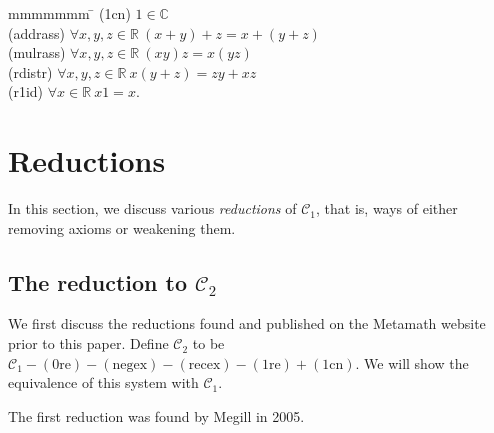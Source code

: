 \documentclass{article}
\newcommand\bC{\mathbb{C}}
\newcommand\bR{\mathbb{R}}
\newcommand\cC{\mathcal{C}}
\begin{document}
\begin{tabbing}
mmmmmmm \=\kill
(1cn)     \> $1 \in \bC$ \\
(addrass) \> $\forall x,y,z \in \bR\ (x+y)+z=x+(y+z)$ \\
(mulrass) \> $\forall x,y,z \in \bR\ (xy)z=x(yz)$ \\
(rdistr)  \> $\forall x,y,z \in \bR\ x(y+z) = zy + xz$ \\
(r1id)    \> $\forall x \in \bR\ x1=x$.
\end{tabbing}

\section{Reductions}
\label{reduction}
In this section, we discuss various \textit{reductions} of $\cC_1$, that is, ways of either removing axioms or weakening them.

\subsection{The reduction to $\cC_2$}

We first discuss the reductions found and published on the Metamath website prior to this paper. Define $\cC_2$ to be $\cC_1 - \mathrm{(0re)} - \mathrm{(negex)} - \mathrm{(recex)} - \mathrm{(1re)} + \mathrm{(1cn)}$. We will show the equivalence of this system with $\cC_1$.

The first reduction was found by Megill in 2005.
\end{document}
